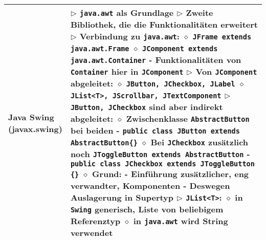 \begin{longtable}{ | p{} p{} | }
	\makecell[l]{Java Swing \\ (javax.swing)} & \makecell[l]{
	$\rhd$ \texttt{java.awt} als Grundlage \\
	$\rhd$ Zweite Bibliothek, die die Funktionalitäten erweitert \\
	$\rhd$ Verbindung zu \texttt{java.awt}: \\
	\hspace{0.4cm} $\diamond$ \texttt{JFrame extends java.awt.Frame} \\
	\hspace{0.4cm} $\diamond$ \texttt{JComponent extends java.awt.Container} \\
	\hspace{0.6cm} - Funktionalitäten von \texttt{Container} hier in \texttt{JComponent} \\
	$\rhd$ Von \texttt{JComponent} abgeleitet: \\
	\hspace{0.4cm} $\diamond$ \texttt{JButton, JCheckbox, JLabel} \\
	\hspace{0.4cm} $\diamond$ \texttt{JList<T>, JScrollbar, JTextComponent} \\
	$\rhd$ \texttt{JButton, JCheckbox} sind aber indirekt abgeleitet: \\
	\hspace{0.4cm} $\diamond$ Zwischenklasse \texttt{AbstractButton} bei beiden \\
	\hspace{0.6cm} - \texttt{public class JButton extends AbstractButton\{\}} \\
	\hspace{0.4cm} $\diamond$ Bei \texttt{JCheckbox} zusätzlich noch \texttt{JToggleButton extends AbstractButton} \\
	\hspace{0.6cm} - \texttt{public class JCheckbox extends JToggleButton \{\}} \\
	\hspace{0.4cm} $\diamond$ \textbf{Grund:} \\
	\hspace{0.6cm} - Einführung zusätzlicher, eng verwandter, Komponenten \\
	\hspace{0.6cm} - Deswegen Auslagerung in Supertyp \\
	$\rhd$ \texttt{JList<T>}: \\
	\hspace{0.4cm} $\diamond$ in \texttt{Swing} generisch, Liste von beliebigem Referenztyp \\
	\hspace{0.4cm} $\diamond$ in \texttt{java.awt} wird String verwendet} \\ \hline
	 

\end{longtable}
